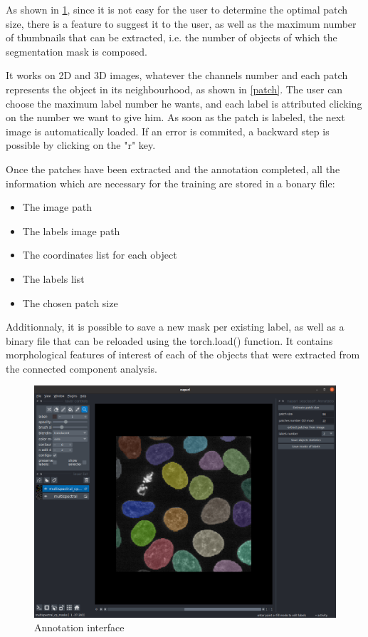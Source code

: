 \documentclass{article}
\begin{document}
As shown in \ref{labelization}, since it is not easy for the user to determine the optimal patch size, there is a feature to suggest it to the user, as well as the maximum number of thumbnails that can be extracted, i.e. the number of objects of which the segmentation mask is composed. 

It works on 2D and 3D images, whatever the channels number and each patch represents the object in its neighbourhood, as shown in \ref{patch}. The user can choose the maximum label number he wants, and each label is attributed clicking on the number we want to give him. As soon as the patch is labeled, the next image is automatically loaded. If an error is commited, a backward step is possible by clicking on the "r" key.

Once the patches have been extracted and the annotation completed, all the information which are necessary for the training are stored in a bonary file:
\begin{itemize}
  \item The image path 
  \item The labels image path
  \item The coordinates list for each object
  \item The labels list
  \item The chosen patch size  
\end{itemize}
Additionnaly, it is possible to save a new mask per existing label, as well as a binary file that can be reloaded using the torch.load() function. It contains morphological features of interest of each of the objects that were extracted from the connected component analysis.


\begin{figure}[htp!]
 \centering
 \includegraphics[scale=0.2]{Figures/annotations.png}
  \caption{Annotation interface}
  \label{labelization}

\end{figure}
\end{document}
